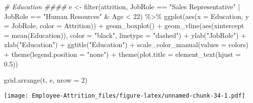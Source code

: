 \documentclass[
]{article}
\newenvironment{Shaded}{\begin{snugshade}}{\end{snugshade}}
\newcommand{\AttributeTok}[1]{\textcolor[rgb]{0.77,0.63,0.00}{#1}}
\newcommand{\CommentTok}[1]{\textcolor[rgb]{0.56,0.35,0.01}{\textit{#1}}}
\newcommand{\DecValTok}[1]{\textcolor[rgb]{0.00,0.00,0.81}{#1}}
\newcommand{\FloatTok}[1]{\textcolor[rgb]{0.00,0.00,0.81}{#1}}
\newcommand{\FunctionTok}[1]{\textcolor[rgb]{0.00,0.00,0.00}{#1}}
\newcommand{\NormalTok}[1]{#1}
\newcommand{\OtherTok}[1]{\textcolor[rgb]{0.56,0.35,0.01}{#1}}
\newcommand{\SpecialCharTok}[1]{\textcolor[rgb]{0.00,0.00,0.00}{#1}}
\newcommand{\StringTok}[1]{\textcolor[rgb]{0.31,0.60,0.02}{#1}}
\begin{document}
\begin{Shaded}
\begin{Highlighting}[]
\CommentTok{\# Education \#\#\#\#}
\NormalTok{e }\OtherTok{\textless{}{-}} \FunctionTok{filter}\NormalTok{(attrition, JobRole }\SpecialCharTok{==} \StringTok{"Sales Representative"} \SpecialCharTok{|}\NormalTok{ JobRole }\SpecialCharTok{==} \StringTok{"Human Resources"} \SpecialCharTok{\&}\NormalTok{ Age }\SpecialCharTok{\textless{}} \DecValTok{22}\NormalTok{) }\SpecialCharTok{\%\textgreater{}\%}
  \FunctionTok{ggplot}\NormalTok{(}\FunctionTok{aes}\NormalTok{(}\AttributeTok{x =}\NormalTok{ Education, }\AttributeTok{y =}\NormalTok{ JobRole, }\AttributeTok{color =}\NormalTok{ Attrition)) }\SpecialCharTok{+}
  \FunctionTok{geom\_boxplot}\NormalTok{() }\SpecialCharTok{+}
  \FunctionTok{geom\_vline}\NormalTok{(}\FunctionTok{aes}\NormalTok{(}\AttributeTok{xintercept =} \FunctionTok{mean}\NormalTok{(Education)), }\AttributeTok{color =} \StringTok{"black"}\NormalTok{, }\AttributeTok{linetype =} \StringTok{"dashed"}\NormalTok{) }\SpecialCharTok{+}
  \FunctionTok{ylab}\NormalTok{(}\StringTok{"JobRole"}\NormalTok{) }\SpecialCharTok{+}
  \FunctionTok{xlab}\NormalTok{(}\StringTok{"Education"}\NormalTok{) }\SpecialCharTok{+}
  \FunctionTok{ggtitle}\NormalTok{(}\StringTok{"Education"}\NormalTok{) }\SpecialCharTok{+}
  \FunctionTok{scale\_color\_manual}\NormalTok{(}\AttributeTok{values =}\NormalTok{ colors) }\SpecialCharTok{+}
  \FunctionTok{theme}\NormalTok{(}\AttributeTok{legend.position =} \StringTok{"none"}\NormalTok{) }\SpecialCharTok{+}
  \FunctionTok{theme}\NormalTok{(}\AttributeTok{plot.title =} \FunctionTok{element\_text}\NormalTok{(}\AttributeTok{hjust =} \FloatTok{0.5}\NormalTok{)) }


\FunctionTok{grid.arrange}\NormalTok{(t, e, }\AttributeTok{nrow =} \DecValTok{2}\NormalTok{)}
\end{Highlighting}
\end{Shaded}

\texttt{[image: Employee-Attrition\_files/figure-latex/unnamed-chunk-34-1.pdf]}
\end{document}
